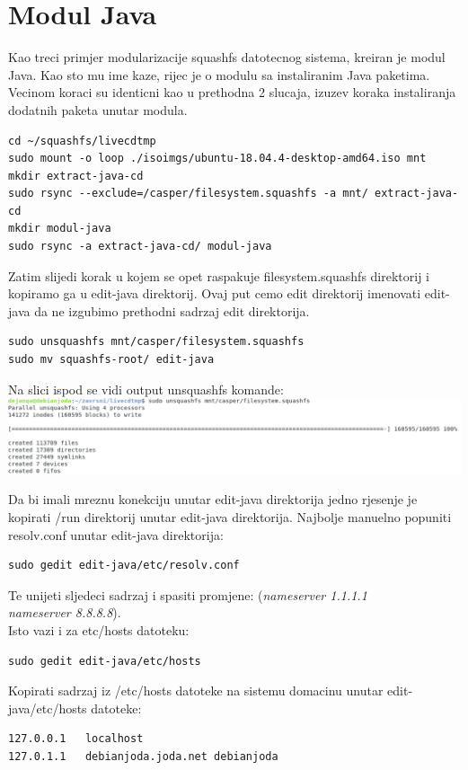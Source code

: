 \documentclass[12pt,vi]{mitthesis}
\begin{document}
\chapter*{Modul Java}
Kao treci primjer modularizacije squashfs datotecnog sistema, kreiran je modul Java. Kao sto mu ime kaze, rijec je o modulu sa instaliranim Java paketima. Vecinom koraci su identicni kao u prethodna 2 slucaja, izuzev koraka instaliranja dodatnih paketa unutar modula.\\
\begin{lstlisting}[style=BashInputStyle]
cd ~/squashfs/livecdtmp
sudo mount -o loop ./isoimgs/ubuntu-18.04.4-desktop-amd64.iso mnt
mkdir extract-java-cd
sudo rsync --exclude=/casper/filesystem.squashfs -a mnt/ extract-java-cd
mkdir modul-java
sudo rsync -a extract-java-cd/ modul-java
\end{lstlisting}
Zatim slijedi korak u kojem se opet raspakuje filesystem.squashfs direktorij i kopiramo ga u edit-java direktorij. Ovaj put cemo edit direktorij imenovati edit-java da ne izgubimo prethodni sadrzaj edit direktorija.\\
\begin{lstlisting}[style=BashInputStyle]
sudo unsquashfs mnt/casper/filesystem.squashfs
sudo mv squashfs-root/ edit-java
\end{lstlisting}
Na slici ispod se vidi output unsquashfs komande:\\
\includegraphics[width=\linewidth]{images/unsquashfscommand.png} 

\noindent
Da bi imali mreznu konekciju unutar edit-java direktorija jedno rjesenje je kopirati /run direktorij unutar edit-java direktorija.
Najbolje manuelno popuniti resolv.conf unutar edit-java direktorija:
\begin{lstlisting}[style=BashInputStyle]
sudo gedit edit-java/etc/resolv.conf
\end{lstlisting}
Te unijeti sljedeci sadrzaj i spasiti promjene:
(\textit{nameserver 1.1.1.1 \\
nameserver 8.8.8.8}).\\
\noindent
Isto vazi i za etc/hosts datoteku:
\begin{lstlisting}[style=BashInputStyle]
sudo gedit edit-java/etc/hosts
\end{lstlisting}
Kopirati sadrzaj iz /etc/hosts datoteke na sistemu domacinu unutar edit-java/etc/hosts datoteke:
\begin{lstlisting}
127.0.0.1	localhost
127.0.1.1	debianjoda.joda.net	debianjoda
\end{lstlisting}
\end{document}
